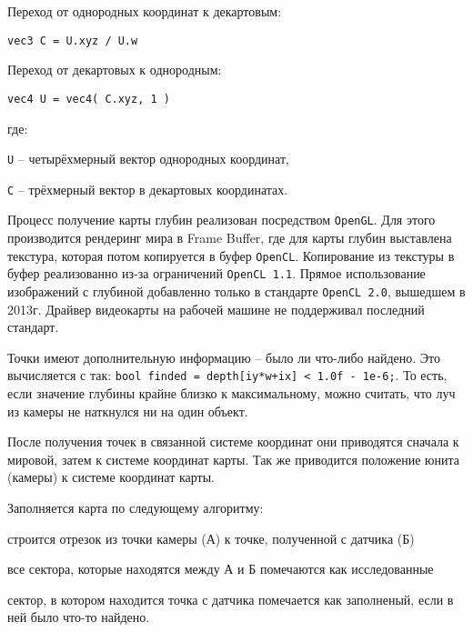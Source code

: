 Переход от однородных координат к декартовым: 

\verb|vec3 C = U.xyz / U.w|

Переход от декартовых к однородным:

\verb|vec4 U = vec4( C.xyz, 1 )|

где:

\verb|U| -- четырёхмерный вектор однородных координат,

\verb|C| -- трёхмерный вектор в декартовых координатах.

Процесс получение карты глубин реализован посредством \verb|OpenGL|. Для этого 
производится рендеринг мира в Frame Buffer, где для карты глубин выставлена текстура, 
которая потом копируется в буфер \verb|OpenCL|. Копирование из текстуры в буфер реализованно
из-за ограничений \verb|OpenCL 1.1|. Прямое использование изображений с глубиной добавленно
только в стандарте \verb|OpenCL 2.0|, вышедшем в 2013г. Драйвер видеокарты на рабочей машине
не поддерживал последний стандарт.

Точки имеют дополнительную информацию -- было ли что-либо найдено.
Это вычисляется с так: \verb|bool finded = depth[iy*w+ix] < 1.0f - 1e-6;|.
То есть, если значение глубины крайне близко к максимальному, можно считать, что
луч из камеры не наткнулся ни на один объект.

После получения точек в связанной системе координат они приводятся
сначала к мировой, затем к системе координат карты.
Так же приводится положение юнита (камеры) к системе координат карты.

Заполняется карта по следующему алгоритму:
\begin{mintemize}
    \item строится отрезок из точки камеры (А) к точке, полученной с датчика (Б)
    \item все сектора, которые находятся между А и Б помечаются как исследованные
    \item сектор, в котором находится точка с датчика помечается как заполненый,
        если в ней было что-то найдено.
\end{mintemize}
